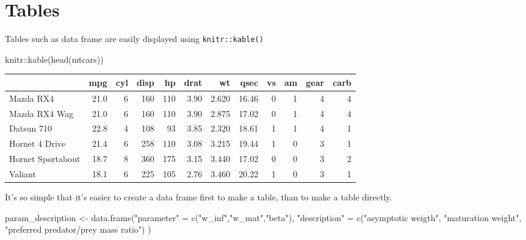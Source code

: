 \documentclass[
  11pt,
]{article}
\newenvironment{Shaded}{\begin{snugshade}}{\end{snugshade}}
\newcommand{\FunctionTok}[1]{\textcolor[rgb]{0.00,0.00,0.00}{#1}}
\newcommand{\NormalTok}[1]{#1}
\newcommand{\OtherTok}[1]{\textcolor[rgb]{0.56,0.35,0.01}{#1}}
\newcommand{\SpecialCharTok}[1]{\textcolor[rgb]{0.00,0.00,0.00}{#1}}
\newcommand{\StringTok}[1]{\textcolor[rgb]{0.31,0.60,0.02}{#1}}
\begin{document}
\newpage

\hypertarget{tables}{%
\section{Tables}\label{tables}}

Tables such as data frame are easily displayed using \texttt{knitr::kable()}

\begin{Shaded}
\begin{Highlighting}[]
\NormalTok{knitr}\SpecialCharTok{::}\FunctionTok{kable}\NormalTok{(}\FunctionTok{head}\NormalTok{(mtcars))}
\end{Highlighting}
\end{Shaded}

\begin{tabular}{l|r|r|r|r|r|r|r|r|r|r|r}
\hline
  & mpg & cyl & disp & hp & drat & wt & qsec & vs & am & gear & carb\\
\hline
Mazda RX4 & 21.0 & 6 & 160 & 110 & 3.90 & 2.620 & 16.46 & 0 & 1 & 4 & 4\\
\hline
Mazda RX4 Wag & 21.0 & 6 & 160 & 110 & 3.90 & 2.875 & 17.02 & 0 & 1 & 4 & 4\\
\hline
Datsun 710 & 22.8 & 4 & 108 & 93 & 3.85 & 2.320 & 18.61 & 1 & 1 & 4 & 1\\
\hline
Hornet 4 Drive & 21.4 & 6 & 258 & 110 & 3.08 & 3.215 & 19.44 & 1 & 0 & 3 & 1\\
\hline
Hornet Sportabout & 18.7 & 8 & 360 & 175 & 3.15 & 3.440 & 17.02 & 0 & 0 & 3 & 2\\
\hline
Valiant & 18.1 & 6 & 225 & 105 & 2.76 & 3.460 & 20.22 & 1 & 0 & 3 & 1\\
\hline
\end{tabular}

It's so simple that it's easier to create a data frame first to make a table, than to make a table directly.

\newpage

\begin{Shaded}
\begin{Highlighting}[]
\NormalTok{param\_description }\OtherTok{\textless{}{-}} \FunctionTok{data.frame}\NormalTok{(}\StringTok{"parameter"} \OtherTok{=} \FunctionTok{c}\NormalTok{(}\StringTok{"w\_inf"}\NormalTok{,}\StringTok{"w\_mat"}\NormalTok{,}\StringTok{"beta"}\NormalTok{),}
                               \StringTok{"description"} \OtherTok{=} \FunctionTok{c}\NormalTok{(}\StringTok{"asymptotic weigth"}\NormalTok{,}
                                                 \StringTok{"maturation weight"}\NormalTok{,}
                                                 \StringTok{"preferred predator/prey mass ratio"}\NormalTok{)}
\NormalTok{)}
\end{Highlighting}
\end{Shaded}
\end{document}
